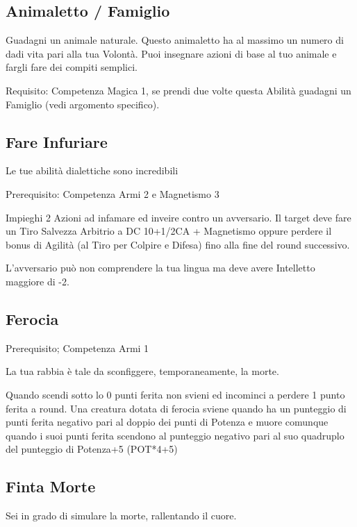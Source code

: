 \documentclass[a4paper,11pt,twoside,openany]{book}
\begin{document}
\subsection{Animaletto / Famiglio}

Guadagni un animale naturale. Questo animaletto ha al massimo un numero di dadi vita pari alla tua Volontà. Puoi insegnare azioni di base al tuo animale e fargli fare dei compiti semplici.

Requisito: Competenza Magica 1, se prendi due volte questa Abilità guadagni un Famiglio (vedi argomento specifico).

\subsection{Fare Infuriare}

Le tue abilità dialettiche sono incredibili

Prerequisito: Competenza Armi 2 e Magnetismo 3

Impieghi 2 Azioni ad infamare ed inveire contro un avversario. Il target deve fare un Tiro Salvezza Arbitrio a DC 10+1/2CA + Magnetismo oppure perdere il bonus di Agilità (al Tiro per Colpire e Difesa) fino alla fine del round successivo.

L'avversario può non comprendere la tua lingua ma deve avere Intelletto maggiore di -2.

\subsection{Ferocia}

Prerequisito; Competenza Armi 1

La tua rabbia è tale da sconfiggere, temporaneamente, la morte.

Quando scendi sotto lo 0 punti ferita non svieni ed incominci a perdere 1 punto ferita a round.
Una creatura dotata di ferocia sviene quando ha un punteggio di punti ferita negativo pari al doppio dei punti di Potenza e muore comunque quando i suoi punti ferita scendono al punteggio negativo pari al suo quadruplo del punteggio di Potenza+5 (POT*4+5)

\subsection{Finta Morte}

Sei in grado di simulare la morte, rallentando il cuore.
\end{document}
